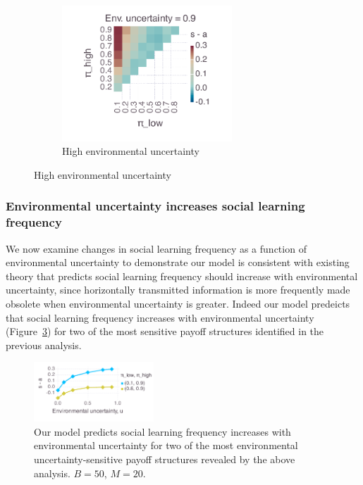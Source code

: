 \documentclass[10pt,letterpaper]{article}
\begin{document}
\begin{figure}
\begin{subfigure}[b]{0.5\textwidth}
    \includegraphics[width=0.7\textwidth]{Figures/expected-payoff-heatmap_envUnc0p9.pdf}
  \caption{High environmental uncertainty}
  \label{fig:expectedPayoffHeatmaps_high}
  \end{subfigure}
  
\end{figure}


\subsubsection{Environmental uncertainty increases social learning frequency}

We now examine changes in social learning frequency as a function of environmental
uncertainty to demonstrate our model is consistent with existing theory that
predicts social learning frequency should increase with environmental 
uncertainty, since horizontally transmitted information is more frequently
made obsolete when environmental uncertainty is greater. Indeed our model predeicts
that social learning frequency increases with environmental uncertainty
(Figure~\ref{fig:environmentalUncertainty})
for two of the most sensitive payoff structures identified in the previous
analysis.

\begin{figure}
  \centering
  \caption{Our model predicts social learning frequency increases with environmental
  uncertainty for two of the most environmental uncertainty-sensitive payoff
  structures revealed by the above analysis. $B = 50$, $M = 20$.}
  \label{fig:environmentalUncertainty}
    \includegraphics[width=0.4\textwidth]{Figures/s-a_overEnvUnc.pdf}
\end{figure}
\end{document}
